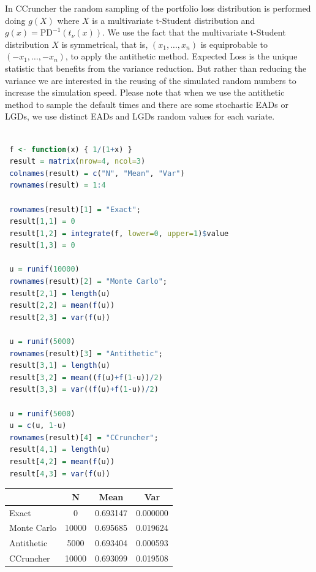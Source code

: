 \documentclass[11pt,fleqn]{book} %
\begin{document}
In CCruncher the random sampling of the portfolio loss distribution is 
performed doing $g(X)$ where $X$ is a multivariate t-Student distribution 
and $g(x) = \text{PD}^{-1}(t_{\nu}(x))$. We use the fact that the multivariate 
t-Student distribution $X$ is symmetrical, that is, $(x_1,\dots,x_n)$ is 
equiprobable to $(-x_1,\dots,-x_n)$, to apply the antithetic method. 
Expected Loss is the unique statistic that benefits from the variance 
reduction. But rather than reducing the variance we are interested 
in the reusing of the simulated random numbers to increase the simulation 
speed. Please note that when we use the antithetic method to sample the 
default times and there are some stochastic EADs or LGDs, we use distinct 
EADs and LGDs random values for each variate.

\begin{lstlisting}[language=R, label=sc:antithetic, caption=Antithetic example (R script)]

 f <- function(x) { 1/(1+x) }
 result = matrix(nrow=4, ncol=3)
 colnames(result) = c("N", "Mean", "Var")
 rownames(result) = 1:4

 rownames(result)[1] = "Exact";
 result[1,1] = 0
 result[1,2] = integrate(f, lower=0, upper=1)$value
 result[1,3] = 0

 u = runif(10000)
 rownames(result)[2] = "Monte Carlo";
 result[2,1] = length(u)
 result[2,2] = mean(f(u))
 result[2,3] = var(f(u))

 u = runif(5000)
 rownames(result)[3] = "Antithetic";
 result[3,1] = length(u)
 result[3,2] = mean((f(u)+f(1-u))/2)
 result[3,3] = var((f(u)+f(1-u))/2)

 u = runif(5000)
 u = c(u, 1-u)
 rownames(result)[4] = "CCruncher";
 result[4,1] = length(u)
 result[4,2] = mean(f(u))
 result[4,3] = var(f(u))

\end{lstlisting}
\hspace*{1cm}
\begin{tabular}{l|c|c|c|}
	\cline{2-4}
	& N & Mean & Var \\
	\hline
	\multicolumn{1}{|l|}{Exact} & 0 & 0.693147 & 0.000000 \\
	\hline
	\multicolumn{1}{|l|}{Monte Carlo} & 10000 & 0.695685 & 0.019624 \\
	\hline
	\multicolumn{1}{|l|}{Antithetic} & 5000 & 0.693404 & 0.000593 \\
	\hline
	\multicolumn{1}{|l|}{CCruncher} & 10000 & 0.693099 & 0.019508 \\
	\hline
\end{tabular}
\vspace{11pt}
\end{document}

